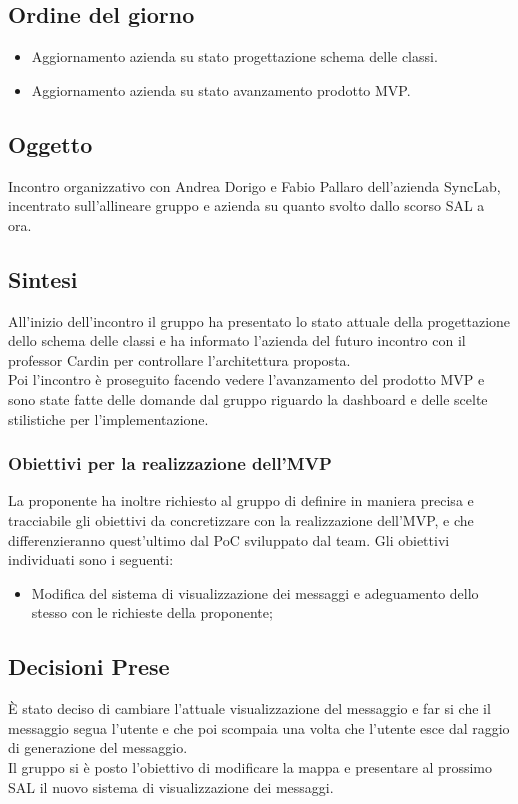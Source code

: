 \documentclass[10pt]{article}
\begin{document}
\subsection{Ordine del giorno}
\begin{itemize}
    \item Aggiornamento azienda su stato progettazione schema delle classi.
    \item Aggiornamento azienda su stato avanzamento prodotto MVP.
\end{itemize}

\subsection{Oggetto}
Incontro organizzativo con Andrea Dorigo e Fabio Pallaro dell'azienda SyncLab, incentrato sull'allineare gruppo e azienda su quanto svolto dallo scorso SAL a ora.

\subsection{Sintesi}
All'inizio dell'incontro il gruppo ha presentato lo stato attuale della progettazione dello schema delle classi e ha informato l'azienda del futuro incontro con il professor Cardin per controllare l'architettura proposta.\\
Poi l'incontro è proseguito facendo vedere l'avanzamento del prodotto MVP e sono state fatte delle domande dal gruppo riguardo la dashboard e delle scelte stilistiche per l'implementazione.\\

\subsubsection{Obiettivi per la realizzazione dell'MVP}
La proponente ha inoltre richiesto al gruppo di definire in maniera precisa e tracciabile gli obiettivi da concretizzare con la realizzazione dell'MVP, e che differenzieranno
quest'ultimo dal PoC sviluppato dal team. Gli obiettivi individuati sono i seguenti:
\begin{itemize}
    \item Modifica del sistema di visualizzazione dei messaggi e adeguamento dello stesso con le richieste della proponente;
\end{itemize}

\subsection{Decisioni Prese}
È stato deciso di cambiare l'attuale visualizzazione del messaggio e far si che il messaggio segua l'utente e che poi scompaia una volta che l'utente esce dal raggio di generazione del messaggio.\\
Il gruppo si è posto l'obiettivo di modificare la mappa e presentare al prossimo SAL il nuovo sistema di visualizzazione dei messaggi.\\
\end{document}
